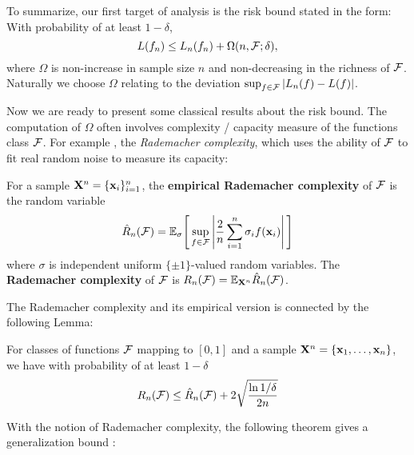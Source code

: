 \begin{remark} \label{rmk:target}
To summarize, our first target of analysis is the risk bound stated in the
form: With probability of at least $1 - \delta$,
\[
L(f_n) \leq L_n(f_n) + \Omega(n, {\cal F}; \delta),
\]
where $\Omega$ is non-increase in sample size $n$ and non-decreasing in
the richness of ${\cal F}$. Naturally we choose $\Omega$ relating to the
deviation $\sup_{f \in {\cal F}}|L_n(f) - L(f)|$.
\end{remark}


Now we are ready to present some classical results about the risk bound.
The computation of $\Omega$ often involves complexity / capacity
measure of the functions class ${\cal F}$. For example \cite{jmlr/BartlettM02},
the {\em Rademacher complexity}, which uses the ability of ${\cal F}$ to fit
real random noise to measure its capacity:

\begin{definition}\label{def:r-com}
For a sample $\mathbf X^n = \{\mathbf{x}_i\}_{i=1}^n$, the {\bf empirical Rademacher
complexity} of ${\cal F}$ is the random variable
\[
\hat{R}_n({\cal F})={\mathbb E}_\sigma\Bigg[\sup_{f \in {\cal F}} \left|\frac{2}{n} \sum_{i=1}^n \sigma_i f(\mathbf{x}_i)\right|\Bigg]
\]
where $\sigma$ is independent uniform $\{\pm1\}$-valued random
variables. The {\bf Rademacher complexity} of ${\cal F}$ is $R_n({\cal F})={\mathbb E}_{\mathbf X^n}
\hat R_n({\cal F})$.
\end{definition}

The Rademacher complexity and its empirical version is connected by the following Lemma:
\begin{lemma} \label{lemma:r-er}
For classes of functions ${\cal F}$ mapping to $[0, 1]$ and a sample $\mathbf X^n = \{
\mathbf{x}_1, \ldots, \mathbf{x}_n\}$, we have with probability of at least $1 - \delta$
\[
R_n({\cal F}) \leq \hat{R}_n({\cal F}) + 2 \sqrt{\frac{\ln1/\delta}{2n}}
\]
\end{lemma}
%
With the notion of Rademacher complexity, the following theorem gives a
generalization bound \cite{pp/KoltchinskiiP00,jmlr/BartlettM02}:

